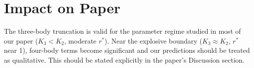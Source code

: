 \documentclass[11pt]{article}
\begin{document}
\section{Impact on Paper}

The three-body truncation is valid for the parameter regime studied in most
of our paper ($K_3 < K_2$, moderate $r^*$).  Near the explosive boundary
($K_3 \approx K_2$, $r^*$ near 1), four-body terms become significant and
our predictions should be treated as qualitative.  This should be stated
explicitly in the paper's Discussion section.
\end{document}
